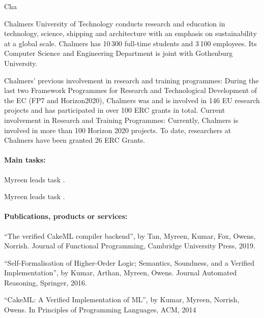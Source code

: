 \begin{sitedescription}{Cha}


Chalmers University of Technology conducts research and education in
technology, science, shipping and architecture with an emphasis on
sustainability at a global scale. Chalmers has 10\,300 full-time
students and 3\,100 employees.  Its Computer Science and Engineering
Department is joint with Gothenburg University.

Chalmers' previous involvement in research and training programmes:
During the last two Framework Programmes for Research and
Technological Development of the EC (FP7 and Horizon2020), Chalmers
was and is involved in 146 EU research projects and has participated
in over 100 ERC grants in total.  Current involvement in Research and
Training Programmes: Currently, Chalmers is involved in more than 100
Horizon 2020 projects.  To date, researchers at Chalmers have been
granted 26 ERC Grants.

\paragraph*{Main tasks:}

\begin{compactitem}
\item Myreen leads task .
\item Myreen leads task .
\end{compactitem}

\paragraph*{Publications, products or services:}

\begin{compactitem}
\item
  ``The verified CakeML compiler backend'',
  by Tan, Myreen, Kumar, Fox, Owens, Norrish.
  Journal of Functional Programming, Cambridge University Press, 2019.
\item
  ``Self-Formalisation of Higher-Order Logic;
  Semantics, Soundness, and a Verified Implementation'',
  by Kumar, Arthan, Myreen, Owens.
  Journal Automated Reasoning, Springer, 2016.
\item
  ``CakeML: A Verified Implementation of ML'',
  by Kumar, Myreen, Norrish, Owens.
  In Principles of Programming Languages, ACM, 2014
\end{compactitem}


\end{sitedescription}
